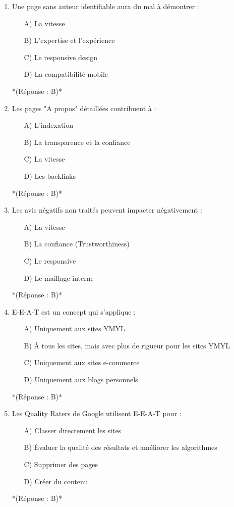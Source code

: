\documentclass[12pt,a4paper,twoside]{report}
\begin{document}
\begin{enumerate}
\item Une page sans auteur identifiable aura du mal à démontrer :
\begin{itemize}
\item[A)] La vitesse
\item[B)] L'expertise et l'expérience
\item[C)] Le responsive design
\item[D)] La compatibilité mobile
\end{itemize}
*(Réponse : B)*

\item Les pages "A propos" détaillées contribuent à :
\begin{itemize}
\item[A)] L'indexation
\item[B)] La transparence et la confiance
\item[C)] La vitesse
\item[D)] Les backlinks
\end{itemize}
*(Réponse : B)*

\item Les avis négatifs non traités peuvent impacter négativement :
\begin{itemize}
\item[A)] La vitesse
\item[B)] La confiance (Trustworthiness)
\item[C)] Le responsive
\item[D)] Le maillage interne
\end{itemize}
*(Réponse : B)*

\item E-E-A-T est un concept qui s'applique :
\begin{itemize}
\item[A)] Uniquement aux sites YMYL
\item[B)] À tous les sites, mais avec plus de rigueur pour les sites YMYL
\item[C)] Uniquement aux sites e-commerce
\item[D)] Uniquement aux blogs personnels
\end{itemize}
*(Réponse : B)*

\item Les Quality Raters de Google utilisent E-E-A-T pour :
\begin{itemize}
\item[A)] Classer directement les sites
\item[B)] Évaluer la qualité des résultats et améliorer les algorithmes
\item[C)] Supprimer des pages
\item[D)] Créer du contenu
\end{itemize}
*(Réponse : B)*


\end{enumerate}
\end{document}
